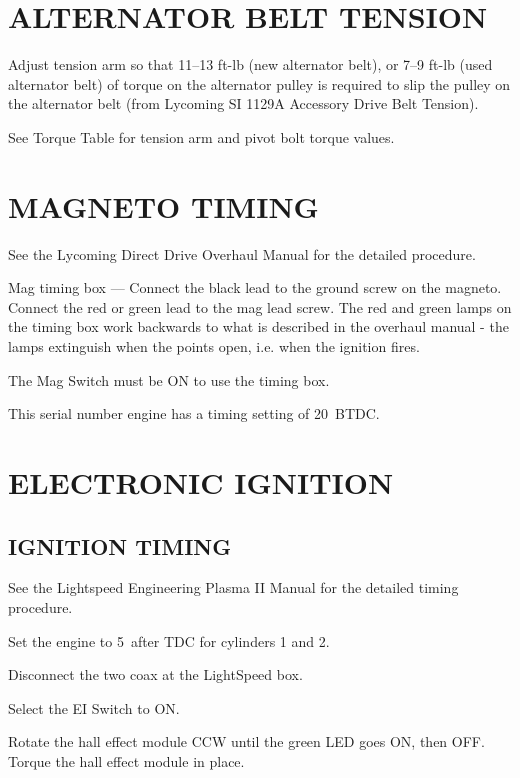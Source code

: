 \begin{enumerate*}
\end{enumerate*}

\section{ALTERNATOR BELT TENSION} 
\begin{enumerate*}
	\item Adjust tension arm so that 11--13 ft-lb (new alternator belt), or 7--9 ft-lb (used alternator belt) of torque on the alternator pulley is required to slip the pulley on the alternator belt (from Lycoming SI 1129A Accessory Drive Belt Tension). 
	\item See Torque Table for tension arm and pivot bolt torque values. 
\end{enumerate*}

\section{MAGNETO TIMING} 
\begin{enumerate*}
	\item See the Lycoming Direct Drive Overhaul Manual for the detailed procedure. 
	\item Mag timing box --- Connect the black lead to the ground screw on the magneto.  Connect the red or green lead to the mag lead screw.  The red and green lamps on the timing box work backwards to what is described in the overhaul manual - the lamps extinguish when the points open, i.e. when the ignition fires. 
	\item The Mag Switch must be ON to use the timing box. 
	\item This serial number engine has a timing setting of 20\textdegree ~BTDC. 
	
\end{enumerate*}

\section{ELECTRONIC IGNITION}
\subsection{IGNITION TIMING} 
\begin{enumerate*}
	\item See the Lightspeed Engineering Plasma II Manual for the detailed timing procedure. 
	\item Set the engine to 5\textdegree ~after TDC for cylinders 1 and 2.
	\item Disconnect the two coax at the LightSpeed box.
	\item Select the EI Switch to ON.
	\item Rotate the hall effect module CCW until the green LED goes ON, then OFF.  Torque the hall effect module in place.
\end{enumerate*}
